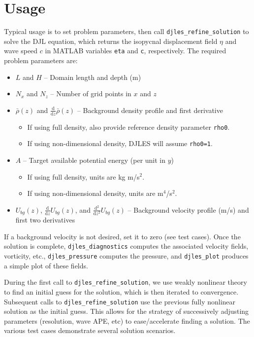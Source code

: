 \documentclass[letterpaper]{article}
\newcommand{\deriv}[2]{\frac{\mathrm{d}#1}{\mathrm{d}#2}}
\begin{document}
\section{Usage}
Typical usage is to set problem parameters, then call \verb+djles_refine_solution+ to solve the DJL equation, which returns the isopycnal displacement field $\eta$ and wave speed $c$ in MATLAB variables \verb+eta+ and \verb+c+, respectively. The required problem parameters are:
\begin{itemize}
 \item $L$ and $H$ -- Domain length and depth (m)
 \item $N_x$ and $N_z$ -- Number of grid points in $x$ and $z$
 \item $\bar{\rho}(z)$ and $\deriv{}{z} \bar{\rho}(z)$
       -- Background density profile and first derivative
       \begin{itemize}
        \item If using full density, also provide reference density parameter \verb+rho0+.
        \item If using non-dimensional density, DJLES will assume \verb+rho0=1+.
       \end{itemize}
 \item $A$ -- Target available potential energy (per unit in $y$)
       \begin{itemize}
        \item If using full density, units are kg m/s$^2$.
        \item If using non-dimensional density, units are m$^4$/s$^2$.
       \end{itemize}
 \item $U_{bg}(z)$, $\deriv{}{z} U_{bg}(z)$, and $\deriv{^2}{z^2} U_{bg}(z)$
       -- Background velocity profile (m/s) and first two derivatives
\end{itemize}
If a background velocity is not desired, set it to zero (see test cases). 
Once the solution is complete, \verb+djles_diagnostics+ computes the associated velocity fields, vorticity, etc., \verb+djles_pressure+ computes the pressure, and \verb+djles_plot+ produces a simple plot of these fields.

During the first call to \verb+djles_refine_solution+, we use weakly nonlinear theory to find an initial guess for the solution, which is then iterated to convergence. Subsequent calls to \verb+djles_refine_solution+ use the previous fully nonlinear solution as the initial guess. This allows for the strategy of successively adjusting parameters (resolution, wave APE, etc) to ease/accelerate finding a solution. The various test cases demonstrate several solution scenarios.
\end{document}
